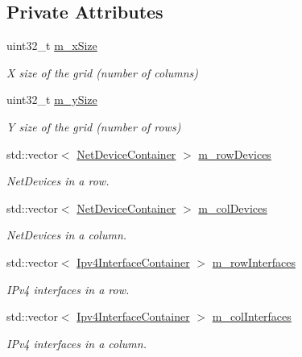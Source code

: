 \subsection*{Private Attributes}
\begin{DoxyCompactItemize}
\item 
uint32\+\_\+t \hyperlink{classns3_1_1PointToPointGridHelper_a9ef53d8b246260fff4a3d6387e6e31d2}{m\+\_\+x\+Size}
\begin{DoxyCompactList}\small\item\em X size of the grid (number of columns) \end{DoxyCompactList}\item 
uint32\+\_\+t \hyperlink{classns3_1_1PointToPointGridHelper_a36acac228174edc92454672bc2fe8ccd}{m\+\_\+y\+Size}
\begin{DoxyCompactList}\small\item\em Y size of the grid (number of rows) \end{DoxyCompactList}\item 
std\+::vector$<$ \hyperlink{classns3_1_1NetDeviceContainer}{Net\+Device\+Container} $>$ \hyperlink{classns3_1_1PointToPointGridHelper_a78e6db5145507c7afec0022097c19e3a}{m\+\_\+row\+Devices}
\begin{DoxyCompactList}\small\item\em Net\+Devices in a row. \end{DoxyCompactList}\item 
std\+::vector$<$ \hyperlink{classns3_1_1NetDeviceContainer}{Net\+Device\+Container} $>$ \hyperlink{classns3_1_1PointToPointGridHelper_a7466f6cdc7e0c8b2461471a6f8921192}{m\+\_\+col\+Devices}
\begin{DoxyCompactList}\small\item\em Net\+Devices in a column. \end{DoxyCompactList}\item 
std\+::vector$<$ \hyperlink{classns3_1_1Ipv4InterfaceContainer}{Ipv4\+Interface\+Container} $>$ \hyperlink{classns3_1_1PointToPointGridHelper_af0f8aef3297f634a1a66751a747d1777}{m\+\_\+row\+Interfaces}
\begin{DoxyCompactList}\small\item\em I\+Pv4 interfaces in a row. \end{DoxyCompactList}\item 
std\+::vector$<$ \hyperlink{classns3_1_1Ipv4InterfaceContainer}{Ipv4\+Interface\+Container} $>$ \hyperlink{classns3_1_1PointToPointGridHelper_a838c160d812d12f4a116861b6390ebc4}{m\+\_\+col\+Interfaces}
\begin{DoxyCompactList}\small\item\em I\+Pv4 interfaces in a column. \end{DoxyCompactList}\item 

\end{DoxyCompactItemize}
